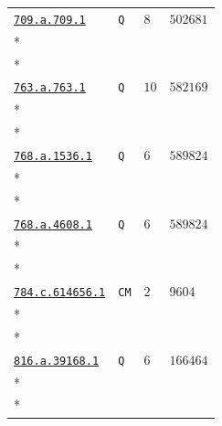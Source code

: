 \documentclass[10pt]{article}
\newcommand{\entryseparator}{\noalign{\vskip3pt\hbox to\linewidth{\leaders\hbox{\kern2pt\rule{3pt}{0.3pt}\kern2pt}\hfill}\nobreak\vskip3pt\nobreak}}
\begin{document}
\begin{landscape}
\begin{longtable}{@{}p{.4\linewidth}>{\centering\arraybackslash}p{.2\linewidth}>{\raggedleft\arraybackslash}p{.16\linewidth}>{\raggedleft\arraybackslash}p{}@{}}
\entryseparator
\href{https://www.lmfdb.org/Genus2Curve/Q/709/a/709/1}{\texttt{709.a.709.1}} & \texttt{Q} & $8$ & $502681$ \\*
\multicolumn{4}{@{}l@{}}{$D_{1}=\left(0,0\right)-\infty_{Y=0}$} \\*
\multicolumn{4}{@{}l@{}}{$D_{2}=\left(1,-1\right)-2\,\infty_{Y=0}+\left(1,0\right)$} \\
\entryseparator
\href{https://www.lmfdb.org/Genus2Curve/Q/763/a/763/1}{\texttt{763.a.763.1}} & \texttt{Q} & $10$ & $582169$ \\*
\multicolumn{4}{@{}l@{}}{$D_{1}=\left(0,0\right)-\left(1,-1\right)$} \\*
\multicolumn{4}{@{}l@{}}{$D_{2}=\infty_{Y=-1}-2\,\left(1,-1\right)+\infty_{Y=0}$} \\
\entryseparator
\href{https://www.lmfdb.org/Genus2Curve/Q/768/a/1536/1}{\texttt{768.a.1536.1}} & \texttt{Q} & $6$ & $589824$ \\*
\multicolumn{4}{@{}l@{}}{$D_{1}=-4\,\left(-\frac{1}{2},-\frac{1}{2}\right)+P_{4}+P_{5}+\left(0,0\right)+\left(0,-1\right)$} \\*
\multicolumn{4}{@{}l@{}}{$D_{2}=-\left(-\frac{1}{2},-\frac{1}{2}\right)+\infty_{Y=0}$} \\
\entryseparator
\href{https://www.lmfdb.org/Genus2Curve/Q/768/a/4608/1}{\texttt{768.a.4608.1}} & \texttt{Q} & $6$ & $589824$ \\*
\multicolumn{4}{@{}l@{}}{$D_{1}=2\,\left(1,-2\right)+2\,P_{3}+2\,P_{4}-2\,P_{5}-2\,P_{6}-\infty_{Y=0}-\infty_{Y=-1}$} \\*
\multicolumn{4}{@{}l@{}}{$D_{2}=6\,\left(-1,0\right)-2\,P_{3}-2\,P_{4}-\infty_{Y=0}-\infty_{Y=-1}$} \\
\entryseparator
\href{https://www.lmfdb.org/Genus2Curve/Q/784/c/614656/1}{\texttt{784.c.614656.1}} & \texttt{CM} & $2$ & $9604$ \\*
\multicolumn{4}{@{}l@{}}{$D_{1}=\left(-1,0\right)-\infty_{Y=0}$} \\*
\multicolumn{4}{@{}l@{}}{$D_{2}=\left(0,0\right)-\infty_{Y=0}$} \\
\entryseparator
\href{https://www.lmfdb.org/Genus2Curve/Q/816/a/39168/1}{\texttt{816.a.39168.1}} & \texttt{Q} & $6$ & $166464$ \\*
\multicolumn{4}{@{}l@{}}{$D_{1}=2\,\left(-\frac{1}{3},-\frac{5}{9}\right)+\left(0,-1\right)+\left(0,0\right)-2\,\left(1,-1\right)-2\,\infty_{Y=0}$} \\*
\multicolumn{4}{@{}l@{}}{$D_{2}=\left(-1,-1\right)-\left(1,-1\right)$} \\

\end{longtable}
\end{landscape}
\end{document}
